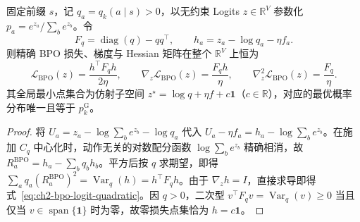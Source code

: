 \documentclass[lang=cn,scheme=chinese,openany]{elegantbook}
\newcommand{\Var}{\operatorname{Var}}
\newcommand{\R}{\mathbb R}
\begin{document}
\begin{proposition}
\label{prop:ch2-bpo-logit-quadratic}
固定前缀 $s$，记 $q_a= q_k(a\mid s)>0$，以无约束 Logits $z\in\R^V$ 参数化 $p_a=e^{z_a}/\sum_b e^{z_b}$。令
\begin{equation*}
 F_q=\operatorname{diag}(q)-qq^\top,\qquad
 h_a=z_a-\log q_a-\eta f_a.
\end{equation*}
则精确 BPO 损失、梯度与 Hessian 矩阵在整个 $\R^V$ 上恒为
\begin{equation}
 \mathcal L_{\mathrm{BPO}}(z)=\frac{h^\top F_q h}{2\eta},\qquad
 \nabla_z\mathcal L_{\mathrm{BPO}}(z)=\frac{F_q h}{\eta},\qquad
 \nabla_z^2\mathcal L_{\mathrm{BPO}}(z)=\frac{F_q}{\eta}.
 \label{eq:ch2-bpo-logit-quadratic}
\end{equation}
其全局最小点集合为仿射子空间 $z^\star=\log q+\eta f+c\mathbf1$（$c\in\R$），对应的最优概率分布唯一且等于 $p_k^{\mathrm G}$。
\end{proposition}
\begin{proof}
将 $U_a=z_a-\log\sum_b e^{z_b}-\log q_a$ 代入 $U_a-\eta f_a=h_a-\log\sum_b e^{z_b}$。在施加 $C_q$ 中心化时，动作无关的对数配分函数 $\log\sum_b e^{z_b}$ 精确相消，故 $R_a^{\mathrm{BPO}}=h_a-\sum_b q_b h_b$。平方后按 $q$ 求期望，即得 $\sum_a q_a(R_a^{\mathrm{BPO}})^2=\Var_q(h)=h^\top F_q h$。由于 $\nabla_z h=I$，直接求导即得式~\eqref{eq:ch2-bpo-logit-quadratic}。因 $q>0$，二次型 $v^\top F_q v=\Var_q(v)\ge 0$ 当且仅当 $v\in\operatorname{span}\{\mathbf1\}$ 时为零，故零损失点集恰为 $h=c\mathbf1$。
\end{proof}
\end{document}
